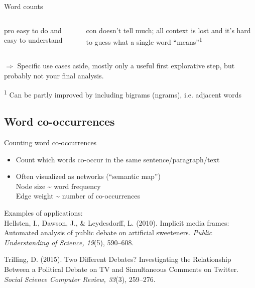 \documentclass{beamer}
\begin{document}
\begin{frame}{Word counts}
	

	\begin{columns}[t]
	\begin{exampleblock}{pro}
		easy to do and easy to understand
	\end{exampleblock}
	\begin{alertblock}{con}
	doesn't tell much; all context is lost and it's hard to guess what a single word ``means''\textsuperscript{1}
	\end{alertblock}
\end{columns}


$\Rightarrow$ Specific use cases aside, mostly only a useful first explorative step, but probably not your final analysis.

\vspace{1cm}

\footnotesize
\textsuperscript{1} Can be partly improved by including bigrams (ngrams), i.e. adjacent words

\end{frame}



\subsection{Word co-occurrences}


\begin{frame}{Counting word co-occurrences}
	\begin{itemize}
		\item Count which words co-occur in the same sentence/paragraph/text
		\item Often visualized as networks (``semantic map'') \\
		Node size \textasciitilde{} word frequency \\
		Edge weight \textasciitilde{} number of co-occurrences
	\end{itemize}
	
	
	Examples of applications: \\
	\tiny
Hellsten, I., Dawson, J., \& Leydesdorff, L. (2010). Implicit media frames: Automated analysis of public debate on artificial sweeteners. \textit{Public Understanding of Science, 19}(5), 590–608. %
	
	
Trilling, D. (2015). Two Different Debates? Investigating the Relationship Between a Political Debate on TV and Simultaneous Comments on Twitter. \textit{Social Science Computer Review, 33}(3), 259–276. %
\end{frame}
\end{document}

